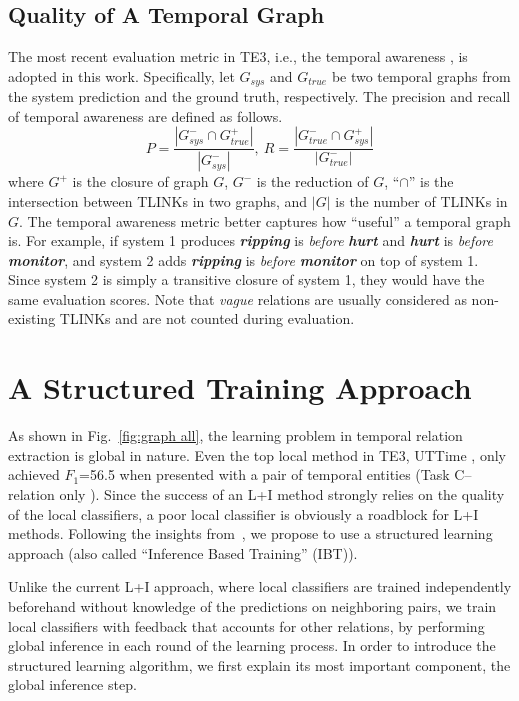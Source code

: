 \documentclass[11pt,letterpaper]{article}
\newcommand{\event}[1]{\textit{\textbf{#1}}}
\newcommand{\rel}[1]{\textit{#1}}
\newcommand{\ignore}[1]{}
\begin{document}
\subsection{Quality of A Temporal Graph}
\ignore{The straightforward evaluation metric for a predicted temporal graph is to count the number of correct TLINKs, and compute the precision and recall using it.}
The most recent evaluation metric in TE3, i.e., the temporal awareness \citep{uzzaman2011temporal}, is adopted in this work.
Specifically, let $G_{sys}$ and $G_{true}$ be two temporal graphs from the system prediction and the ground truth, respectively. The precision and recall of temporal awareness are defined as follows.
$$
P = \frac{|G_{sys}^- \cap G_{true}^+|}{|G_{sys}^-|},~R = \frac{|G_{true}^- \cap G_{sys}^+|}{|G_{true}^-|}
$$
where $G^+$ is the closure of graph $G$, $G^-$ is the reduction of $G$, ``$\cap$'' is the intersection between TLINKs in two graphs, and $\lvert G \rvert$ is the number of TLINKs in $G$.
The temporal awareness metric better captures how ``useful'' a temporal graph is. For example, if system 1 produces \event{ripping} is \rel{before} \event{hurt} and \event{hurt} is \rel{before} \event{monitor}, and system 2 adds \event{ripping} is \rel{before} \event{monitor} on top of system 1. Since system 2 is simply a transitive closure of system 1, they would have the same evaluation scores.
Note that \textit{vague} relations are usually considered as non-existing TLINKs and are not counted during evaluation. 	\section{A Structured Training Approach}
\label{sec:proposed}
As shown in Fig.~\ref{fig:graph all}, the learning problem in temporal relation extraction is global in nature. 
Even the top local method in TE3, UTTime \citep{laokulrat2013uttime}, only achieved $F_1$=56.5 when presented with a pair of temporal entities (Task C--relation only \citep{uzzaman2013TE3}).
Since the success of an L+I method strongly relies on the quality of the local classifiers, a poor local classifier is obviously a roadblock for L+I methods.
Following the insights from~\citet{PRYZ05}, we propose to use a structured learning approach (also called ``Inference Based Training'' (IBT)).


Unlike the current L+I approach, where local classifiers are trained independently beforehand without knowledge of the predictions on neighboring pairs, we train local classifiers with feedback that accounts for other relations, by performing global inference in each round of the learning process. 
In order to introduce the structured learning algorithm, we first explain its most important component, the global inference step.
\end{document}
